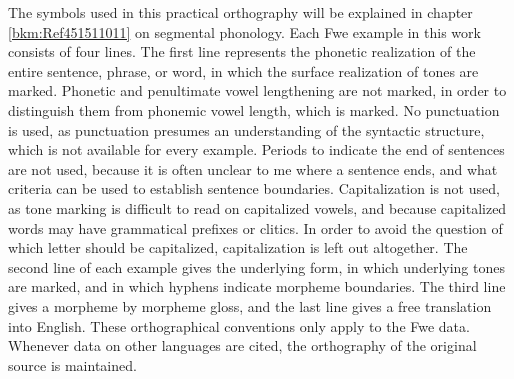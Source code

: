 The symbols used in this practical orthography will be explained in chapter \ref{bkm:Ref451511011} on segmental phonology. Each Fwe example in this work consists of four lines. The first line represents the phonetic realization of the entire sentence, phrase, or word, in which the surface realization of tones are marked. Phonetic and penultimate vowel lengthening are not marked, in order to distinguish them from phonemic vowel length, which is marked. No punctuation is used, as punctuation presumes an understanding of the syntactic structure, which is not available for every example. Periods to indicate the end of sentences are not used, because it is often unclear to me where a sentence ends, and what criteria can be used to establish sentence boundaries. Capitalization is not used, as tone marking is difficult to read on capitalized vowels, and because capitalized words may have grammatical prefixes or clitics. In order to avoid the question of which letter should be capitalized, capitalization is left out altogether. The second line of each example gives the underlying form, in which underlying tones are marked, and in which hyphens indicate morpheme boundaries. The third line gives a morpheme by mor\-pheme gloss, and the last line gives a free translation into English. These orthographical conventions only apply to the Fwe data. Whenever data on other languages are cited, the orthography of the original source is maintained.

